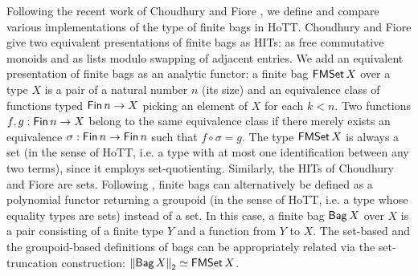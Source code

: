 \documentclass[runningheads]{llncs}
\begin{document}
Following the recent work of Choudhury and Fiore \cite{Choudhury2021}, we define and compare various implementations of the type of finite bags in HoTT. Choudhury and Fiore give two equivalent presentations of finite bags as HITs: as free commutative monoids and as lists modulo swapping of adjacent entries. We add an equivalent presentation of finite bags as an analytic functor: a finite bag $\operatorname{\mathsf{FMSet}} X$ over a type $X$ is a pair of a natural number $n$ (its size) and an equivalence class of functions typed $\operatorname{\mathsf{Fin}} n \to X$ picking an element of $X$ for each $k < n$. Two functions $f ,g :\operatorname{\mathsf{Fin}} n \to X$ belong to the same equivalence class if there merely exists an equivalence $\sigma : \operatorname{\mathsf{Fin}} n \to \operatorname{\mathsf{Fin}} n$ such that $f \circ \sigma = g$. The type $\operatorname{\mathsf{FMSet}} X$ is always a set (in the sense of HoTT, i.e. a type with at most one identification between any two terms), since it employs set-quotienting. Similarly, the HITs of Choudhury and Fiore are sets. Following \cite{Kock2012}, finite bags can alternatively be defined as a polynomial functor returning a groupoid (in the sense of HoTT, i.e. a type whose equality types are sets) instead of a set. In this case, a finite bag $\operatorname{\mathsf{Bag}} X$ over $X$ is a pair consisting of a finite type $Y$ and a function from $Y$ to $X$. The set-based and the groupoid-based definitions of bags can be appropriately related via the set-truncation construction: ${\lVert \operatorname{\mathsf{Bag}} X \rVert}_{\mathsf{2}} \simeq \operatorname{\mathsf{FMSet}} X$.
\end{document}
